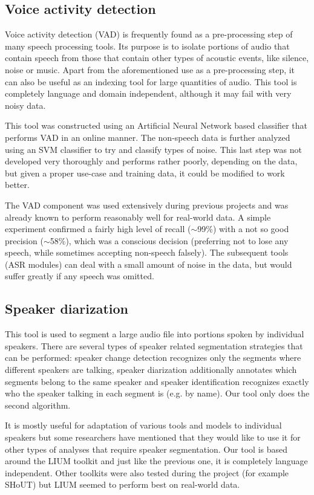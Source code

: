 \documentclass[a4paper,11pt]{article}
\begin{document}
\subsection{Voice activity detection}

Voice activity detection (VAD) is frequently found as a pre-processing step of many speech processing tools. Its purpose is to isolate portions of audio that contain speech from those that contain other types of acoustic events, like silence, noise or music. Apart from the aforementioned use as a pre-processing step, it can also be useful as an indexing tool for large quantities of audio. This tool is completely language and domain independent, although it may fail with very noisy data.

This tool was constructed using an Artificial Neural Network based classifier that performs VAD in an online manner. The non-speech data is further analyzed using an SVM classifier to try and classify types of noise. This last step was not developed very thoroughly and performs rather poorly, depending on the data, but given a proper use-case and training data, it could be modified to work better.

The VAD component was used extensively during previous projects and was already known to perform reasonably well for real-world data. A simple experiment confirmed a fairly high level of recall ($\sim$99\%) with a not so good precision ($\sim$58\%), which was a conscious decision (preferring not to lose any speech, while sometimes accepting non-speech falsely). The subsequent tools (ASR modules) can deal with a small amount of noise in the data, but would suffer greatly if any speech was omitted.

\subsection{Speaker diarization}

This tool is used to segment a large audio file into portions spoken by individual speakers. There are several types of speaker related segmentation strategies that can be performed: speaker change detection recognizes only the segments where different speakers are talking, speaker diarization additionally annotates which segments belong to the same speaker and speaker identification recognizes exactly who the speaker talking in each segment is (e.g. by name). Our tool only does the second algorithm. 

It is mostly useful for adaptation of various tools and models to individual speakers but some researchers have mentioned that they would like to use it for other types of analyses that require speaker segmentation. Our tool is based around the LIUM \cite{meignier2010lium} toolkit and just like the previous one, it is completely language independent. Other toolkits were also tested during the project (for example SHoUT\cite{huijbregts2006shout}) but LIUM seemed to perform best on real-world data.
\end{document}
